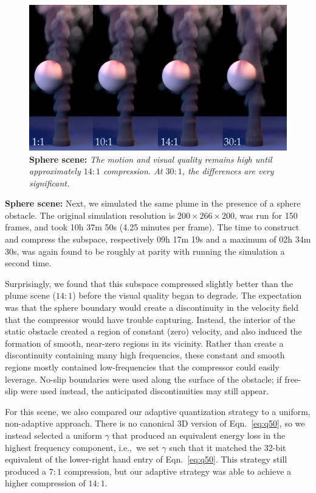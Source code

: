 \begin{figure}[t]
\includegraphics[width=\columnwidth]{chap4/figures/spheres_sidebyside_14.png}
\caption{\textbf{Sphere scene:} {\em The motion and visual quality remains high until approximately $14:1$ compression. At $30:1$, the differences are very significant.}}
\label{fig:sphereComparison}
\end{figure}

\noindent \textbf{Sphere scene:} Next, we simulated the same plume in the presence of a sphere obstacle. The original simulation resolution is $200 \times 266 \times 200$, was run for 150 frames, and took 10h 37m 50s (4.25 minutes per frame). The time to construct and compress the subspace, respectively 09h 17m 19s and a maximum of 02h 34m 30s, was again found to be roughly at parity with running the simulation a second time. 

Surprisingly, we found that this subspace compressed slightly better than the plume scene ($14:1$) before the visual quality began to degrade. The expectation was that the sphere boundary would create a discontinuity in the velocity field that the compressor would have trouble capturing. Instead, the interior of the static obstacle created a region of constant (zero) velocity, and also induced the formation of smooth, near-zero regions in its vicinity. Rather than create a discontinuity containing many high frequencies, these constant and smooth regions mostly contained low-frequencies that the compressor could easily leverage. No-slip boundaries were used along the surface of the obstacle; if free-slip were used instead, the anticipated discontinuities may still appear.

For this scene, we also compared our adaptive quantization strategy to a uniform, non-adaptive approach. There is no canonical 3D version of Eqn.~\ref{eq:q50}, so we instead selected a uniform $\gamma$ that produced an equivalent energy loss in the highest frequency component, i.e.,~we set $\gamma$ such that it matched the 32-bit equivalent of the lower-right hand entry of Eqn.~\ref{eq:q50}. This strategy still produced a $7:1$ compression, but our adaptive strategy was able to achieve a higher compression of $14:1$.

